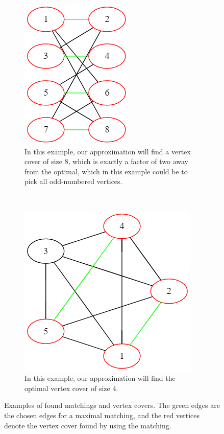\documentclass[a4paper]{article}
\begin{document}
	\begin{figure}[H]
		\centering
		\begin{subfigure}[t]{.45\textwidth}
			\centering
			\includegraphics[scale=.5]{figures/bipartite-matching.png} 
			\caption{In this example, our approximation will find a vertex cover of size 8, which is exactly a factor of two away from the optimal, which in this example could be to pick all odd-numbered vertices.}
		\end{subfigure}
		~
		\begin{subfigure}[t]{.45\textwidth}
			\centering
			\includegraphics[scale=.5]{figures/5fullyconnected-matching.png}
			\caption{In this example, our approximation will find the optimal vertex cover of size 4.}
		\end{subfigure}
	\caption{Examples of found matchings and vertex covers. The green edges are the chosen edges for a maximal matching, and the red vertices denote the vertex cover found by using the matching.}
	\label{vertexcover:examples}
	\end{figure}
\end{document}
